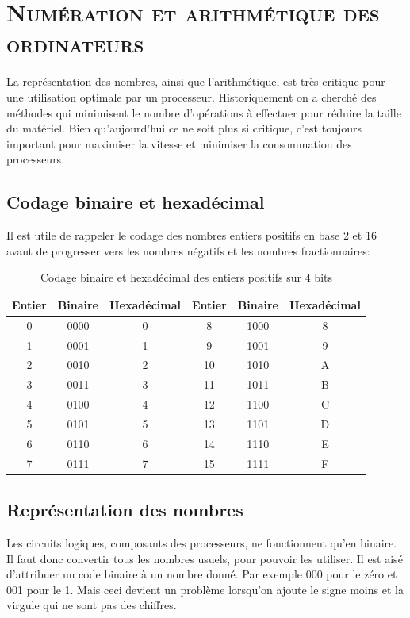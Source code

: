 \chapter{\textsc{Numération et arithmétique des ordinateurs}}
La représentation des nombres, ainsi que l'arithmétique, est très critique pour une utilisation optimale par un processeur. Historiquement on a cherché des méthodes qui minimisent le nombre d'opérations à effectuer pour réduire la taille du matériel. Bien qu'aujourd'hui ce ne soit plus si critique, c'est toujours important pour maximiser la vitesse et minimiser la consommation des processeurs.

\section{Codage binaire et hexadécimal}
Il est utile de rappeler le codage des nombres entiers positifs en base 2 et 16 avant de progresser vers les nombres négatifs et les nombres fractionnaires:

\begin{table}[!htbp]
\begin{center}
{\selectfont
\begin{tabular}{|c|c|c||c|c|c|}
\hline 
Entier & Binaire & Hexadécimal & Entier & Binaire & Hexadécimal\\
\hline  
0 & 0000 & 0 & 8 & 1000 & 8\\
1 & 0001 & 1 & 9 & 1001 & 9\\
2 & 0010 & 2 & 10 & 1010 & A\\
3 & 0011 & 3 & 11 & 1011 & B\\
4 & 0100 & 4 & 12 & 1100 & C\\
5 & 0101 & 5 & 13 & 1101 & D\\
6 & 0110 & 6 & 14 & 1110 & E\\
7 & 0111 & 7 & 15 & 1111 & F\\
\hline 
\end{tabular}
}
\end{center}
\caption{Codage binaire et hexadécimal des entiers positifs sur 4 bits \label{binaire hexa}}
\end{table}

\section{Représentation des nombres}
Les circuits logiques, composants des processeurs, ne fonctionnent qu'en binaire. Il faut donc convertir tous les nombres usuels, pour pouvoir les utiliser. Il est aisé d'attribuer un code binaire à un nombre donné. Par exemple 000 pour le zéro et 001 pour le 1. Mais ceci devient un problème lorsqu'on ajoute le signe moins et la virgule qui ne sont pas des chiffres.

